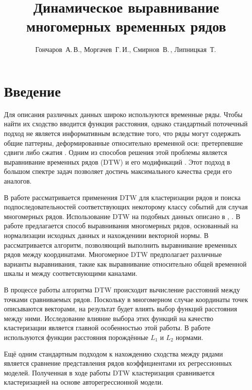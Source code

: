 \documentclass[12pt,twoside]{article}
\title
        {Динамическое выравнивание многомерных временных рядов}
\author
        {Гончаров~А.\,В., Моргачев~Г.\,И., Смирнов~В.\,, Липницкая~Т.\,} %
\begin{document}
    \maketitle
    \setcounter{secnumdepth}{3}
    \section{Введение}
        
        Для описания различных данных широко используются временные ряды.
        Чтобы найти их сходство вводится функция расстояния, однако стандартный поточечный подход не является информативным вследствие того,
        что ряды могут содержать общие паттерны, деформированные относительно временной оси: претерпевшие сдвиги либо сжатия \cite{01f4ab11a9ff49ff909094a135dcfe33}.
        Одним из способов решения этой проблемы является выравнивание временных рядов (DTW)  \cite{Keogh01derivativedynamic} и его модификаций \cite{journals/ida/SalvadorC07}.
        Этот подход в большом спектре задач позволяет достичь максимального качества среди его аналогов.
        
        В работе рассматривается применения DTW для кластеризации рядов и поиска подпоследовательностей
        соответствующих некоторому классу событий для случая многомерных рядов.
        Использование DTW на подобных данных описано в \cite{Holt2007}, \cite{Sanguansat2012MultipleMS}.
        В работе \cite{Holt2007} предлагается способ выравнивания многомерных рядов, основанный на нормализации исходных данных и нахождениии векторной нормы.
        В \cite{Sanguansat2012MultipleMS} рассматривается алгоритм, позволяющий выполнить выравнивание временных рядов между координатами. 
        Многомерное DTW предполагает различные варианты выравнивания, такие как выравнивание относительно общей временной шкалы и между соответсвующими каналами.
        
        В процессе работы алгоритма DTW происходит вычисление расстояний между точками сравниваемых рядов.
        Поскольку в многомерном случае координаты точек описываются векторами, на результат будет влиять выбор функций расстояния между ними.
        Исследование влияние выбора этих функций на качество кластеризации является главной особенностью этой работы.
        В работе используются функции расстояния порождённые $L_1$ и $L_2$ нормами.
        
        Ещё одним стандартным подходом к нахождению сходства между рядами является сравнение представления рядов коэффициентами их регрессионных моделей.
        Полученная в ходе работы DTW кластеризация сравнивается кластеризацией на основе авторегрессионной модели.
    
\end{document}
